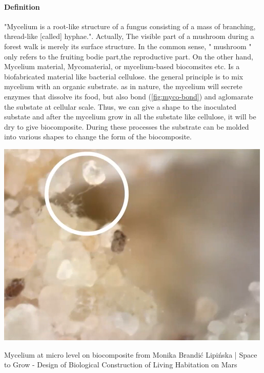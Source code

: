\paragraph[short]{Definition}
"Mycelium is a root-like structure of a fungus consisting of a mass of branching, thread-like [called] hyphae."\cite{wikipediaMycelium}. Actually, The visible part of a mushroom during a forest walk is merely its surface structure. In the common sense, " mushroom " only refers to the fruiting bodie part,the reproductive part. 
On the other hand, Mycelium material, Mycomaterial, or mycelium-based biocomsites etc. Is a biofabricated material like bacterial cellulose. the general principle is to mix mycelium with an organic substrate. as in nature, the mycelium will secrete enzymes that dissolve its food, but also bond\cite{MonikaBrandićLipińskaHBBE} (\ref{fig:myco-bond}) and aglomarate the substate at cellular scale. 
Thus, we can give a shape to the inoculated substate and after the mycelium grow in all the substate like cellulose, it will be dry to give biocomposite. During these processes the substrate can be molded into various shapes to change the form of the biocomposite. 

\begin{marginfigure}
    \centering
    \includegraphics{images/bond-mycelium.png}    
    \caption{Mycelium at micro level on biocomposite from  Monika Brandić Lipińska | Space to Grow - Design of Biological Construction of Living Habitation on Mars}
    \label{fig:myco-bond}
\end{marginfigure}

